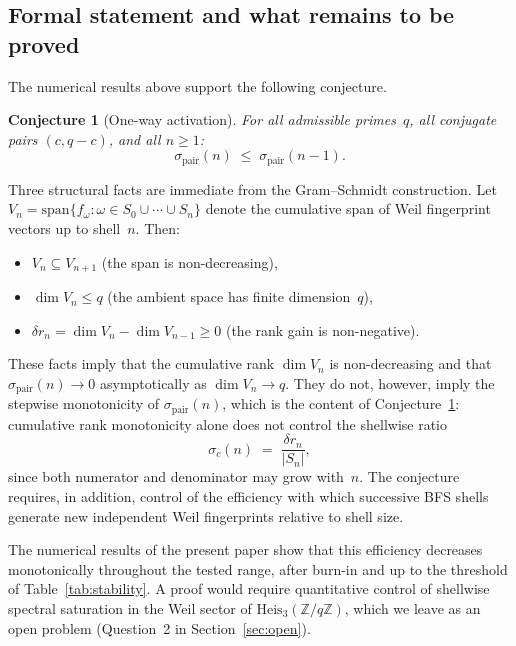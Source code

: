 \documentclass[11pt,a4paper]{article}
\newtheorem{conjecture}{Conjecture}
\begin{document}
  \subsection*{Formal statement and what remains to be proved}
  \label{subsec:formal}

  The numerical results above support the following conjecture.

  \begin{conjecture}[One-way activation]
    \label{conj:owa}
    For all admissible primes~$q$, all conjugate pairs $(c, q{-}c)$, and
    all $n \geq 1$:
    \begin{equation}
      \label{eq:owa}
      \sigma_{\mathrm{pair}}(n) \;\leq\; \sigma_{\mathrm{pair}}(n-1).
    \end{equation}
  \end{conjecture}

  Three structural facts are immediate from the Gram--Schmidt construction.
  Let $V_n = \mathrm{span}\{f_\omega : \omega \in S_0 \cup \cdots \cup S_n\}$
  denote the cumulative span of Weil fingerprint vectors up to shell~$n$.
  Then:
  \begin{itemize}
    \item $V_n \subseteq V_{n+1}$ (the span is non-decreasing),
    \item $\dim V_n \leq q$ (the ambient space has finite dimension~$q$),
    \item $\delta r_n = \dim V_n - \dim V_{n-1} \geq 0$ (the rank gain is
    non-negative).
  \end{itemize}
  These facts imply that the cumulative rank $\dim V_n$ is
  non-decreasing and that $\sigma_{\mathrm{pair}}(n) \to 0$
  asymptotically as $\dim V_n \to q$.
  They do not, however, imply the stepwise monotonicity of
  $\sigma_{\mathrm{pair}}(n)$, which is the content of
  Conjecture~\ref{conj:owa}: cumulative rank
  monotonicity alone does not control the shellwise ratio
  \begin{equation}
    \label{eq:ratio}
    \sigma_c(n) \;=\; \frac{\delta r_n}{|S_n|},
  \end{equation}
  since both numerator and denominator may grow with~$n$.
  The conjecture requires, in addition, control of the efficiency with
  which successive BFS shells generate new independent Weil fingerprints
  relative to shell size.

  The numerical results of the present paper show that this efficiency
  decreases monotonically throughout the tested range, after burn-in and up to
  the threshold of Table~\ref{tab:stability}.
  A proof would require quantitative control of shellwise spectral
  saturation in the Weil sector of $\mathrm{Heis}_3(\mathbb{Z}/q\mathbb{Z})$,
  which we leave as an open problem (Question~2 in Section~\ref{sec:open}).
\end{document}

